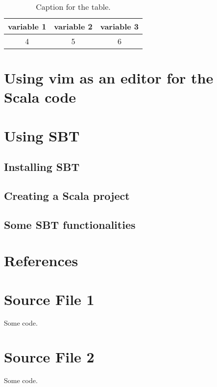 \documentclass{article}
\begin{document}
\begin{table}[h!]
\centering
\caption{Caption for the table.}
\label{tab: table2}
\begin{tabular}{ccc}
\toprule

variable 1 & variable 2 & variable 3 \\

\midrule

4 & 5 & 6 \\


\bottomrule
\end{tabular}
\end{table}


\section{Using vim as an editor for the Scala code}
\section{Using SBT}
\subsection{Installing SBT}
\subsection{Creating a Scala project}
\subsection{Some SBT functionalities}
\section{References}



\listoffigures
\listoftables

\begin{appendices}

\section{Source File 1}

Some code.

\section{Source File 2}

Some code.
\end{appendices}  
\end{document}
